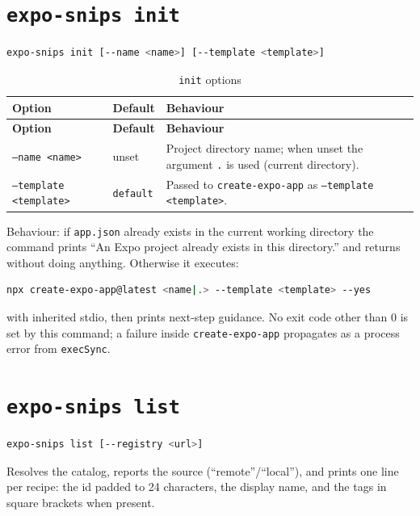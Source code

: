 \section{\texttt{expo-snips init}}

\begin{lstlisting}[language=bash]
expo-snips init [--name <name>] [--template <template>]
\end{lstlisting}

\begin{longtable}{@{}L{2.6cm}L{1.6cm}L{10.4cm}@{}}
\caption{\texttt{init} options}\\
\toprule
\textbf{Option} & \textbf{Default} & \textbf{Behaviour} \\
\midrule
\endfirsthead
\toprule
\textbf{Option} & \textbf{Default} & \textbf{Behaviour} \\
\midrule
\endhead
\texttt{--name <name>} & unset & Project directory name; when unset the argument
\texttt{.} is used (current directory). \\
\texttt{--template <template>} & \texttt{default} & Passed to
\texttt{create-expo-app} as \texttt{--template <template>}. \\
\bottomrule
\end{longtable}

Behaviour: if \texttt{app.json} already exists in the current working directory the
command prints ``An Expo project already exists in this directory.'' and returns
without doing anything. Otherwise it executes:

\begin{lstlisting}[language=bash]
npx create-expo-app@latest <name|.> --template <template> --yes
\end{lstlisting}

with inherited stdio, then prints next-step guidance. No exit code other than 0 is
set by this command; a failure inside \texttt{create-expo-app} propagates as a
process error from \texttt{execSync}.

\section{\texttt{expo-snips list}}

\begin{lstlisting}[language=bash]
expo-snips list [--registry <url>]
\end{lstlisting}

Resolves the catalog, reports the source (``remote''/``local''), and prints one
line per recipe: the id padded to 24 characters, the display name, and the tags in
square brackets when present.

